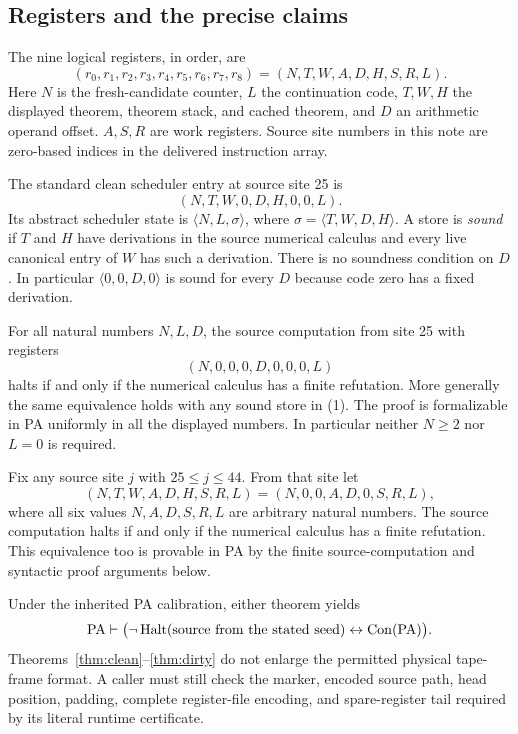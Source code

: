 \subsection{Registers and the precise claims}

The nine logical registers, in order, are
\[
 (r_0,r_1,r_2,r_3,r_4,r_5,r_6,r_7,r_8)
       =(N,T,W,A,D,H,S,R,L).
\]
Here $N$ is the fresh-candidate counter, $L$ the continuation code,
$T,W,H$ the displayed theorem, theorem stack, and cached theorem, and $D$
an arithmetic operand offset. $A,S,R$ are work registers. Source site
numbers in this note are zero-based indices in the delivered instruction
array.

The standard clean scheduler entry at source site 25 is
\[
 (N,T,W,0,D,H,0,0,L).
\tag{1}
\]
Its abstract scheduler state is $\langle N,L,\sigma\rangle$, where
$\sigma=\langle T,W,D,H\rangle$. A store is \emph{sound} if $T$ and $H$
have derivations in the source numerical calculus and every live canonical
entry of $W$ has such a derivation. There is no soundness condition on
$D$. In particular $\langle0,0,D,0\rangle$ is sound for every $D$ because
code zero has a fixed derivation.

\begin{theorem}\label{thm:clean}
For all natural numbers $N,L,D$, the source computation from site 25 with
registers
\[
                (N,0,0,0,D,0,0,0,L)
\tag{2}
\]
halts if and only if the numerical calculus has a finite refutation.
More generally the same equivalence holds with any sound store in (1).
The proof is formalizable in PA uniformly in all the displayed numbers.
In particular neither $N\ge2$ nor $L=0$ is required.
\end{theorem}

\begin{theorem}\label{thm:dirty}
Fix any source site $j$ with $25\le j\le44$. From that site let
\[
          (N,T,W,A,D,H,S,R,L)=(N,0,0,A,D,0,S,R,L),
\tag{3}
\]
where all six values $N,A,D,S,R,L$ are arbitrary natural numbers.
The source computation halts if and only if the numerical calculus has a
finite refutation. This equivalence too is provable in PA by the finite
source-computation and syntactic proof arguments below.
\end{theorem}

Under the inherited PA calibration, either theorem yields
\[
 \mathrm{PA}\vdash \bigl(\neg\operatorname{Halt}(\text{source from the stated seed})
                  \leftrightarrow\operatorname{Con}(\mathrm{PA})\bigr).
\]
Theorems~\ref{thm:clean}--\ref{thm:dirty} do not enlarge the permitted
physical tape-frame format. A caller must still check the marker, encoded
source path, head position, padding, complete register-file encoding, and
spare-register tail required by its literal runtime certificate.

